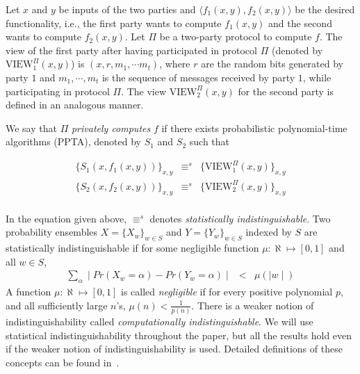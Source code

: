 \begin{definition}
\label{def:privacy}
\rm
Let $x$ and $y$ be inputs of the two parties and $\langle f_1 (x,y),
f_2 (x,y) \rangle$ be the desired functionality, i.e., the first party
wants to compute $f_1 (x,y)$ and the second wants to compute $f_2
(x,y)$. Let $\Pi$ be a two-party protocol to compute $f$. The view
of the first party after having participated in protocol $\Pi$ 
(denoted by $\mbox{VIEW}_1^\Pi (x,y)$) is $(x,r,m_1, \cdots m_t)$, where
$r$ are the random bits generated by party $1$ and $m_1, \cdots, m_t$ is the
sequence of messages received by party $1$, while participating in protocol
$\Pi$. The view $\mbox{VIEW}_2^\Pi (x,y)$ for the second party  is defined
in an analogous manner.

We say that $\Pi$ {\em privately computes} $f$ if there exists 
probabilistic polynomial-time algorithms (PPTA), denoted by $S_1$ and $S_2$
such that

\begin{eqnarray*}
\{ S_1 (x,f_1 (x,y)) \}_{x,y} & \equiv^s & \{ \mbox{VIEW}_1^\Pi (x,y) \}_{x,y} \\
\{ S_2 (x,f_2 (x,y)) \}_{x,y} & \equiv^s & \{ \mbox{VIEW}_2^\Pi (x,y) \}_{x,y} \\
\end{eqnarray*}

In the equation given above, $\equiv^s$ denotes {\em statistically
indistinguishable}.  Two probability ensembles $X = \{ X_w \}_{w \in
S}$ and $Y = \{ Y_w \}_{w \in S}$ indexed by $S$ are statistically
indistinguishable if for some negligible function $\mu : \aleph \mapsto
[0,1]$ and all $w \in S$,
\begin{eqnarray*}
\sum_{\alpha} \mid Pr ( X_w = \alpha ) - Pr ( Y_w = \alpha ) \mid & < & \mu ( \mid w \mid )
\end{eqnarray*}
A function $\mu : \aleph \mapsto [0,1]$ is called {\it negligible}
if for every positive polynomial $p$, and all sufficiently large $n$'s,
$\mu (n) < \frac{1}{p(n)}$. There is a weaker notion of indistinguishability
called {\em computationally indistinguishable}. We will use statistical
indistinguishability throughout the paper, but all the results hold even if
the weaker notion of indistinguishability is used. Detailed definitions of
these concepts can be found in~\cite{GoldreichBookVol1,GoldreichBookVol2}. 

\end{definition}

